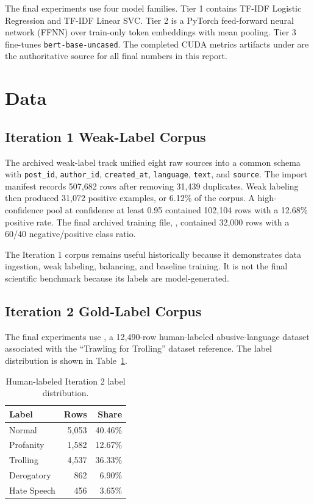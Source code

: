 \documentclass[11pt]{article}
\begin{document}
The final experiments use four model families. Tier 1 contains TF-IDF Logistic Regression and TF-IDF Linear SVC. Tier 2 is a PyTorch feed-forward neural network (FFNN) over train-only token embeddings with mean pooling. Tier 3 fine-tunes \texttt{bert-base-uncased}. The completed CUDA metrics artifacts under  are the authoritative source for all final numbers in this report.

\section{Data}

\subsection{Iteration 1 Weak-Label Corpus}

The archived weak-label track unified eight raw sources into a common schema with \texttt{post\_id}, \texttt{author\_id}, \texttt{created\_at}, \texttt{language}, \texttt{text}, and \texttt{source}. The import manifest records 507,682 rows after removing 31,439 duplicates. Weak labeling then produced 31,072 positive examples, or 6.12\% of the corpus. A high-confidence pool at confidence at least 0.95 contained 102,104 rows with a 12.68\% positive rate. The final archived training file, , contained 32,000 rows with a 60/40 negative/positive class ratio.

The Iteration 1 corpus remains useful historically because it demonstrates data ingestion, weak labeling, balancing, and baseline training. It is not the final scientific benchmark because its labels are model-generated.

\subsection{Iteration 2 Gold-Label Corpus}

The final experiments use , a 12,490-row human-labeled abusive-language dataset associated with the ``Trawling for Trolling'' dataset reference. The label distribution is shown in Table~\ref{tab:label-dist}.

\begin{table}[H]
\centering
\caption{Human-labeled Iteration 2 label distribution.}
\label{tab:label-dist}
\begin{tabular}{lrr}
\toprule
Label & Rows & Share \\
\midrule
Normal & 5,053 & 40.46\% \\
Profanity & 1,582 & 12.67\% \\
Trolling & 4,537 & 36.33\% \\
Derogatory & 862 & 6.90\% \\
Hate Speech & 456 & 3.65\% \\
\bottomrule
\end{tabular}
\end{table}
\end{document}
